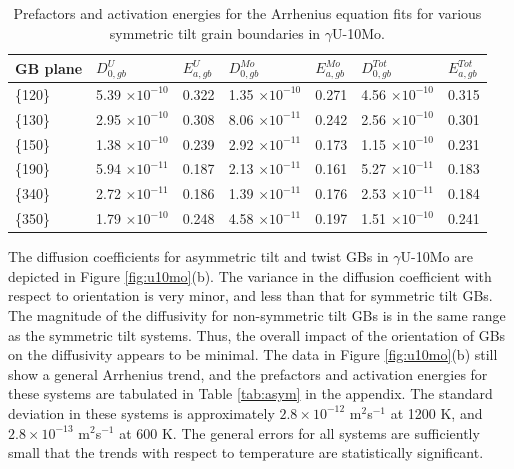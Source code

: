 \documentclass{elsarticle}
\begin{document}
\begin{table}[!ht]
\centering
\caption{Prefactors and activation energies for the Arrhenius equation fits for various symmetric tilt grain boundaries in $\gamma$U-10Mo.}
\label{tab:u10moArr}
\begin{tabular}{lllllll}
\toprule
GB plane & $D_{0,gb}^U$      & $E_{a,gb}^U$
	 & $D_{0,gb}^{Mo}$   & $E_{a,gb}^{Mo}$
	 & $D_{0,gb}^{Tot}$  & $E_{a,gb}^{Tot}$ \\
\midrule
\{120\} & 5.39 $\times 10^{-10}$ & 0.322
        & 1.35 $\times 10^{-10}$ & 0.271
        & 4.56 $\times 10^{-10}$ & 0.315  \\
\{130\} & 2.95 $\times 10^{-10}$ & 0.308
        & 8.06 $\times 10^{-11}$ & 0.242
        & 2.56 $\times 10^{-10}$ & 0.301  \\
\{150\} & 1.38 $\times 10^{-10}$ & 0.239
        & 2.92 $\times 10^{-11}$ & 0.173
        & 1.15 $\times 10^{-10}$ & 0.231  \\
\{190\} & 5.94 $\times 10^{-11}$ & 0.187
        & 2.13 $\times 10^{-11}$ & 0.161
        & 5.27 $\times 10^{-11}$ & 0.183  \\
\{340\} & 2.72 $\times 10^{-11}$ & 0.186
        & 1.39 $\times 10^{-11}$ & 0.176
        & 2.53 $\times 10^{-11}$ & 0.184  \\
\{350\} & 1.79 $\times 10^{-10}$ & 0.248
        & 4.58 $\times 10^{-11}$ & 0.197
        & 1.51 $\times 10^{-10}$ & 0.241  \\
\bottomrule
\end{tabular}
\end{table}

The diffusion coefficients for asymmetric tilt and twist GBs in $\gamma$U-10Mo are depicted in Figure \ref{fig:u10mo}(b). The variance in the diffusion coefficient with respect to orientation is very minor, and less than that for symmetric tilt GBs. The magnitude of the diffusivity for non-symmetric tilt GBs is in the same range as the symmetric tilt systems. Thus, the overall impact of the orientation of GBs on the diffusivity appears to be minimal. The data in Figure \ref{fig:u10mo}(b) still show a general Arrhenius trend, and the prefactors and activation energies for these systems are tabulated in Table \ref{tab:asym} in the appendix. The standard deviation in these systems is approximately $2.8 \times 10^{-12}$ m$^2$s$^{-1}$ at 1200 K, and $2.8 \times 10^{-13}$ m$^2$s$^{-1}$ at 600 K. The general errors for all systems are sufficiently small that the trends with respect to temperature are statistically significant.
\end{document}
